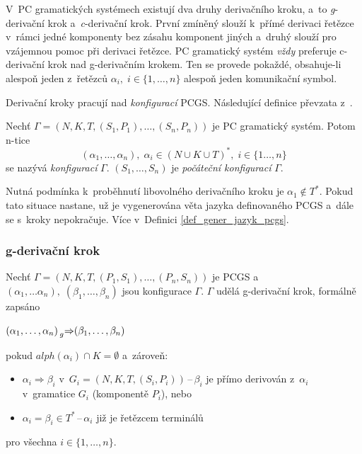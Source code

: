 V~PC gramatických systémech existují dva druhy derivačního kroku, a~to \emph{g}-derivační krok a~\emph{c}-derivační krok.
První zmíněný slouží k~přímé derivaci řetězce v~rámci jedné komponenty bez zásahu komponent jiných a~druhý slouží pro vzájemnou pomoc při derivaci řetězce. 
PC gramatický systém \emph{vždy} preferuje c-derivační krok nad g-derivačním krokem.
Ten se provede pokaždé, obsahuje-li alespoň jeden z~řetězců $\alpha_i,\; i \in \{1, \ldots, n\}$ alespoň jeden komunikační symbol.

Derivační kroky pracují nad \emph{konfigurací} PCGS.
Následující definice převzata z~\cite{Various-communications-in-PC-grammar-systems}.
\begin{definition}
    Nechť $\Gamma = (N, K, T, (S_1, P_1), \ldots, (S_n, P_n))$ je PC gramatický systém.
    Potom n-tice
    \begin{equation*}
        (\alpha_1, \ldots, \alpha_n),\; \alpha_i \in (N \cup K \cup T)^*,\; i \in \{1 \ldots, n\}
    \end{equation*}
    se nazývá \emph{konfigurací} $\Gamma$. $(S_1, \ldots, S_n)$ je \emph{počáteční konfigurací} $\Gamma$.
\end{definition}
Nutná podmínka k~proběhnutí libovolného derivačního kroku je $\alpha_1 \notin T^*$.
Pokud tato situace nastane, už je vygenerována věta jazyka definovaného PCGS a~dále se s~kroky nepokračuje. 
Více v~Definici \ref{def_gener_jazyk_pcgs}.

\subsubsection*{g-derivační krok}\label{kap_g_der_krok}
Nechť $\Gamma = (N, K, T, (P_1, S_1), \ldots, (P_n, S_n))$ je PCGS a~$(\alpha_1, \ldots \alpha_n),\; (\beta_1, \ldots, \beta_n)$ jsou konfigurace $\Gamma$.
$\Gamma$ udělá g-derivační krok, formálně zapsáno
\begin{center}
    $(\alpha_1, \ldots, \alpha_n) \prescript{}{g}{\Rightarrow} (\beta_1, \ldots, \beta_n)$
\end{center}
pokud $alph(\alpha_i) \cap K = \emptyset$ a~zároveň:
\begin{itemize}
    \item $\alpha_i \Rightarrow \beta_i$ v~$G_i = (N, K, T, (S_i, P_i))$\,--\,$\beta_i$ je přímo derivován z~$\alpha_i$ v~gramatice $G_i$ (komponentě $P_i$), nebo
    \item $\alpha_i = \beta_i \in T^*$\,--\,$\alpha_i$ již je řetězcem terminálů
\end{itemize}   
pro všechna $i \in \{1, \ldots, n\}$.

